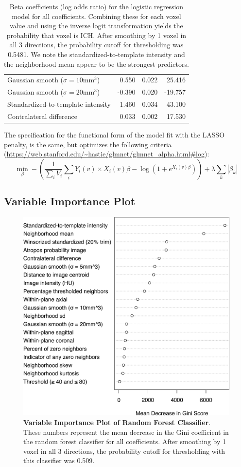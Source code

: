 \documentclass{elsarticle_nonatbib}\usepackage[]{graphicx}\usepackage[]{color}
\begin{document}
\begin{table}[ht]
\begin{tabular}{lrrr}
  Gaussian smooth ($\sigma = 10$mm$^3$) & 0.550 & 0.022 & 25.416 \\ 
  Gaussian smooth ($\sigma = 20$mm$^3$) & -0.390 & 0.020 & -19.757 \\ 
  Standardized-to-template intensity & 1.460 & 0.034 & 43.100 \\ 
  Contralateral difference & 0.033 & 0.002 & 17.530 \\ 
   \hline
\end{tabular}
\caption{Beta coefficients (log odds ratio) for the logistic regression model for all coefficients.  Combining these for each voxel value and using the inverse logit transformation yields the probability that voxel is ICH. After smoothing by 1 voxel in all 3 directions, the probability cutoff for thresholding was 0.5481.  We note the standardized-to-template intensity and the neighborhood mean appear to be the strongest predictors.} 
\label{tab:modspec}
\end{table}


The specification for the functional form of the model fit with the LASSO penalty, is the same, but optimizes the following criteria (\url{https://web.stanford.edu/~hastie/glmnet/glmnet_alpha.html#log}):
$$
\min_{\beta} - \left( \frac{1}{\sum_{i}V_i} \sum_i Y_{i}(v) \times X_i(v)\beta - \log \left(1 + e^{X_i(v)\beta}\right) \right) +\lambda\sum_{k}\left|\beta_k\right|
$$

\subsection{Variable Importance Plot}
\label{sec:varimp}



\begin{figure}
\centering
\includegraphics[width=0.75\linewidth,keepaspectratio]{Reseg_VarImpPlot.png}
\caption{{\bf Variable Importance Plot of Random Forest Classifier}. These numbers represent the mean decrease in the Gini coefficient in the random forest classifier for all coefficients.  After smoothing by 1 voxel in all 3 directions, the probability cutoff for thresholding with this classifier was 0.509.  }
\label{fig:varimp}
\end{figure}
\end{document}
